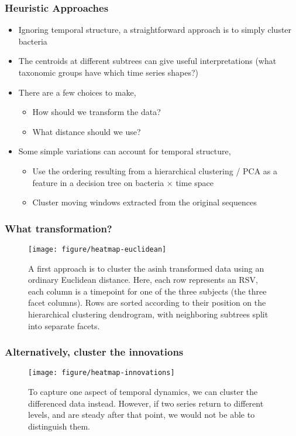 \documentclass{beamer}
\begin{document}
\begin{frame}
  \frametitle{Heuristic Approaches} 
  \begin{itemize}
  \item Ignoring temporal structure, a straightforward approach is to simply
    cluster bacteria
  \item The centroids at different subtrees can give useful interpretations (what
    taxonomic groups have which time series shapes?)
  \item There are a few choices to make,
    \begin{itemize}
    \item How should we transform the data?
    \item What distance should we use?
    \end{itemize} 
  \item Some simple variations can account for temporal structure,
    \begin{itemize}
      \item Use the ordering resulting from a hierarchical clustering / PCA as a
        feature in a decision tree on bacteria $\times$ time space
      \item Cluster moving windows extracted from the original sequences
    \end{itemize}
  \end{itemize}
\end{frame}

\begin{frame}
  \frametitle{What transformation?}
 \begin{figure}
   \centering
   \texttt{[image: figure/heatmap-euclidean]}
   \caption{A first approach is to cluster the asinh transformed data using an
     ordinary Euclidean distance. Here, each row represents an RSV, each column
     is a timepoint for one of the three subjects (the three facet columns).
     Rows are sorted according to their position on the hierarchical
     clustering dendrogram, with neighboring subtrees split into separate
     facets. \label{fig:heatmap-euclidean}}
 \end{figure}
\end{frame}

\begin{frame}
  \frametitle{Alternatively, cluster the innovations}
 \begin{figure}[ht]
   \centering
   \texttt{[image: figure/heatmap-innovations]}
   \caption{To capture one aspect of temporal dynamics, we can cluster the
     differenced data instead. However, if two series return to different
     levels, and are steady after that point, we would not be able to
     distinguish them. \label{fig:heatmap-innovations} }
 \end{figure}
\end{frame}
\end{document}
